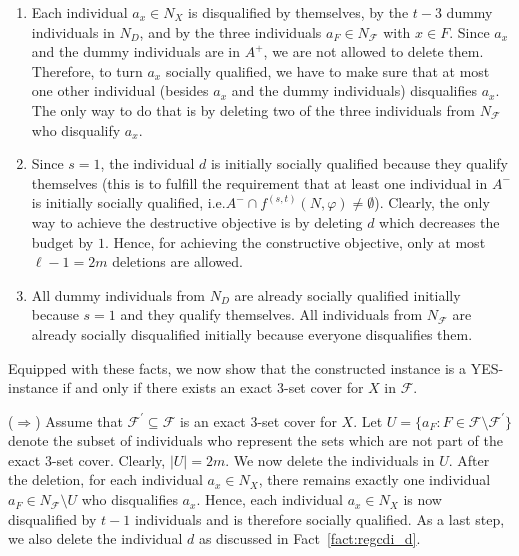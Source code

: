 \documentclass[
    12pt,               %
    a4paper,            %
    bibtotoc,           %
    pointlessnumbers,   %
    ngerman,            %
    titlepage,          %
    leqno,              %
    ]{scrarticle}       %
\newcommand\factref{Fact~\ref}
\begin{document}
\begin{Proof}
\begin{enumerate}[
    topsep=-4pt,
    leftmargin=*,
    itemindent=4.4em,
    label={\textit{Fact \ref*{thm:f1t_regcdi_npc}.\arabic*}:},
    ref={\ref*{thm:f1t_regcdi_npc}.\arabic*}
]
\item \label{fact:regcdi_nx}
Each individual $a_x \in N_X$ is disqualified by themselves, by the $t-3$ dummy individuals in $N_D$, and by the three individuals $a_F \in N_\mathcal{F}$ with $x \in F$. Since $a_x$ and the dummy individuals are in $A^+$, we are not allowed to delete them. Therefore, to turn $a_x$ socially qualified, we have to make sure that at most one other individual (besides $a_x$ and the dummy individuals) disqualifies $a_x$. The only way to do that is by deleting two of the three individuals from $N_\mathcal{F}$ who disqualify $a_x$.

\item \label{fact:regcdi_d}
Since $s=1$, the individual $d$ is initially socially qualified because they qualify themselves (this is to fulfill the requirement that at least one individual in $A^-$ is initially socially qualified, i.e.\@ $A^- \cap f^{(s, t)}(N, \varphi) \neq \emptyset$). Clearly, the only way to achieve the destructive objective is by deleting $d$ which decreases the budget by $1$. Hence, for achieving the constructive objective, only at most $\ell - 1 = 2m$ deletions are allowed.

\item \label{fact:regcdi_nd_nf}
All dummy individuals from $N_D$ are already socially qualified initially because $s=1$ and they qualify themselves. All individuals from $N_\mathcal{F}$ are already socially disqualified initially because everyone disqualifies them.
\end{enumerate}



Equipped with these facts, we now show that the constructed instance is a YES-instance if and only if there exists an exact 3-set cover for $X$ in $\mathcal{F}$.

($\Rightarrow$) Assume that $\mathcal{F}^\prime \subseteq \mathcal{F}$ is an exact 3-set cover for $X$. Let $U = \{ a_F : F \in \mathcal{F} \setminus \mathcal{F}^\prime \}$ denote the subset of individuals who represent the sets which are not part of the exact 3-set cover. Clearly, $|U| = 2m$. We now delete the individuals in $U$. After the deletion, for each individual $a_x \in N_X$, there remains exactly one individual $a_F \in N_\mathcal{F} \setminus U$ who disqualifies $a_x$. Hence, each individual $a_x \in N_X$ is now disqualified by $t-1$ individuals and is therefore socially qualified. As a last step, we also delete the individual $d$ as discussed in \factref{fact:regcdi_d}.


\end{Proof}
\end{document}
